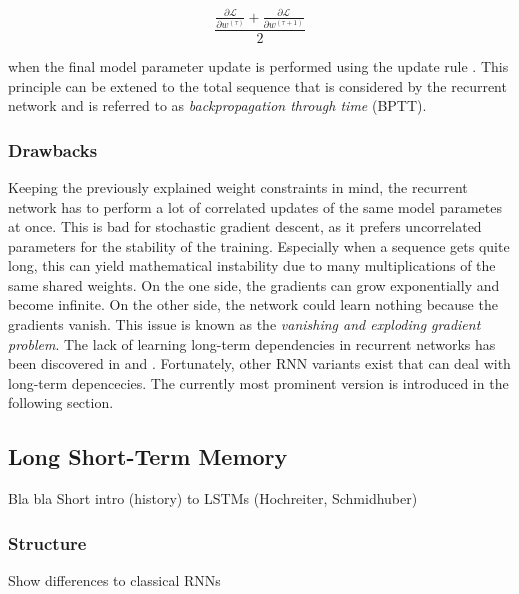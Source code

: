 \begin{equation} \label{eq:rnn}
	\frac{\frac{\partial \mathcal{L}}{\partial w^{(\tau)}} + \frac{\partial \mathcal{L}}{\partial w^{(\tau+1)}}}{2}
\end{equation}

when the final model parameter update is performed using the update rule \parencite{rnn-bptt}. This principle can be extened to the total sequence that is considered by the recurrent network and is referred to as \textit{backpropagation through time} (BPTT).

\subsubsection{Drawbacks} \label{sec:rnn-drawbacks}

Keeping the previously explained weight constraints in mind, the recurrent network has to perform a lot of correlated updates of the same model parametes at once. This is bad for stochastic gradient descent, as it prefers uncorrelated parameters for the stability of the training. Especially when a sequence gets quite long, this can yield mathematical instability due to many multiplications of the same shared weights. On the one side, the gradients can grow exponentially and become infinite. On the other side, the network could learn nothing because the gradients vanish. This issue is known as the \textit{vanishing and exploding gradient problem}. The lack of learning long-term dependencies in recurrent networks has been discovered in \parencite{hochreiter} and \parencite{rnn-vanish}. Fortunately, other RNN variants exist that can deal with long-term depencecies. The currently most prominent version is introduced in the following section.


\subsection{Long Short-Term Memory}

Bla bla
Short intro (history) to LSTMs (Hochreiter, Schmidhuber)

\subsubsection{Structure}
Show differences to classical RNNs

